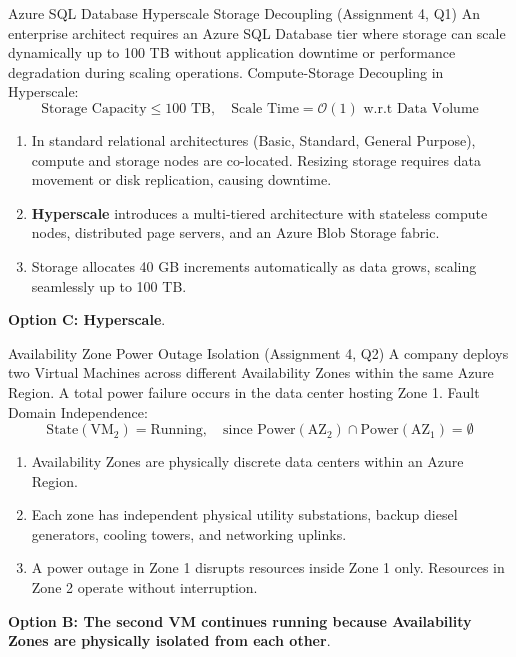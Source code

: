 \begin{solved}{Azure SQL Database Hyperscale Storage Decoupling (Assignment 4, Q1)}
\Given An enterprise architect requires an Azure SQL Database tier where storage can scale dynamically up to 100 TB without application downtime or performance degradation during scaling operations.
\Formula Compute-Storage Decoupling in Hyperscale:
\begin{equation}
\text{Storage Capacity} \le 100\text{ TB}, \quad \text{Scale Time} = \mathcal{O}(1) \text{ w.r.t Data Volume}
\end{equation}
\Steps
\begin{enumerate}[leftmargin=*]
  \item In standard relational architectures (Basic, Standard, General Purpose), compute and storage nodes are co-located. Resizing storage requires data movement or disk replication, causing downtime.
  \item \textbf{Hyperscale} introduces a multi-tiered architecture with stateless compute nodes, distributed page servers, and an Azure Blob Storage fabric.
  \item Storage allocates 40 GB increments automatically as data grows, scaling seamlessly up to 100 TB.
\end{enumerate}
\Answer \textbf{Option C: Hyperscale}.
\end{solved}

\begin{solved}{Availability Zone Power Outage Isolation (Assignment 4, Q2)}
\Given A company deploys two Virtual Machines across different Availability Zones within the same Azure Region. A total power failure occurs in the data center hosting Zone 1.
\Formula Fault Domain Independence:
\begin{equation}
\text{State}(\text{VM}_2) = \text{Running}, \quad \text{since } \text{Power}(\text{AZ}_2) \cap \text{Power}(\text{AZ}_1) = \emptyset
\end{equation}
\Steps
\begin{enumerate}[leftmargin=*]
  \item Availability Zones are physically discrete data centers within an Azure Region.
  \item Each zone has independent physical utility substations, backup diesel generators, cooling towers, and networking uplinks.
  \item A power outage in Zone 1 disrupts resources inside Zone 1 only. Resources in Zone 2 operate without interruption.
\end{enumerate}
\Answer \textbf{Option B: The second VM continues running because Availability Zones are physically isolated from each other}.
\end{solved}

